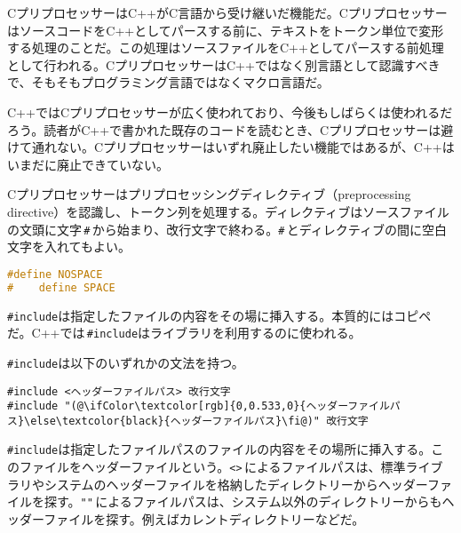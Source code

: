 
CプリプロセッサーはC++がC言語から受け継いだ機能だ。CプリプロセッサーはソースコードをC++としてパースする前に、テキストをトークン単位で変形する処理のことだ。この処理はソースファイルをC++としてパースする前処理として行われる。CプリプロセッサーはC++ではなく別言語として認識すべきで、そもそもプログラミング言語ではなくマクロ言語だ。

C++ではCプリプロセッサーが広く使われており、今後もしばらくは使われるだろう。読者がC++で書かれた既存のコードを読むとき、Cプリプロセッサーは避けて通れない。Cプリプロセッサーはいずれ廃止したい機能ではあるが、C++はいまだに廃止できていない。

Cプリプロセッサーはプリプロセッシングディレクティブ（preprocessing directive）を認識し、トークン列を処理する。ディレクティブはソースファイルの文頭に文字\,\texttt{\#}\,から始まり、改行文字で終わる。\texttt{\#}\,とディレクティブの間に空白文字を入れてもよい。

\begin{lstlisting}[language={C++}]
#define NOSPACE
#    define SPACE
\end{lstlisting}


\texttt{\#include}は指定したファイルの内容をその場に挿入する。本質的にはコピペだ。C++では\,\texttt{\#include}はライブラリを利用するのに使われる。

\texttt{\#include}は以下のいずれかの文法を持つ。

\begin{lstlisting}[style=grammar]
#include <ヘッダーファイルパス> 改行文字
#include "(@\ifColor\textcolor[rgb]{0,0.533,0}{ヘッダーファイルパス}\else\textcolor{black}{ヘッダーファイルパス}\fi@)" 改行文字
\end{lstlisting}

\texttt{\#include}は指定したファイルパスのファイルの内容をその場所に挿入する。このファイルをヘッダーファイルという。\texttt{<>}\,によるファイルパスは、標準ライブラリやシステムのヘッダーファイルを格納したディレクトリーからヘッダーファイルを探す。\texttt{""}\,によるファイルパスは、システム以外のディレクトリーからもヘッダーファイルを探す。例えばカレントディレクトリーなどだ。


